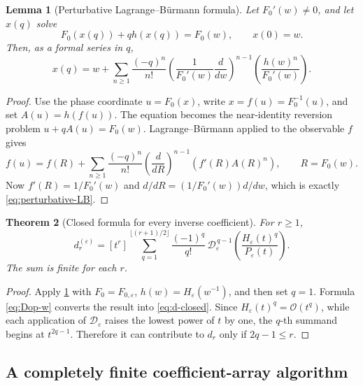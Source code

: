 \documentclass[11pt,a4paper]{article}
\theoremstyle{clean}
\newtheorem{theorem}{Theorem}[section]
\newtheorem{lemma}[theorem]{Lemma}
\theoremstyle{definition}
\newcommand{\eps}{\varepsilon}
\newcommand{\Coeff}[2]{\left[#1\right]#2}
\newcommand{\OO}{\mathcal O}
\newcommand{\Dop}{\mathscr D}
\begin{document}
\begin{lemma}[Perturbative Lagrange--B\"urmann formula]
\label{lem:perturbative-LB}
Let \(F_0'(w)\ne0\), and let \(x(q)\) solve
\[
 F_0(x(q))+q h(x(q))=F_0(w),\qquad x(0)=w.
\]
Then, as a formal series in \(q\),
\begin{equation}
 x(q)=w+\sum_{n\ge1}\frac{(-q)^n}{n!}
 \left(\frac1{F_0'(w)}\frac{d}{dw}\right)^{n-1}
 \left(\frac{h(w)^n}{F_0'(w)}\right).
 \label{eq:perturbative-LB}
\end{equation}
\end{lemma}

\begin{proof}
Use the phase coordinate \(u=F_0(x)\), write \(x=f(u)=F_0^{-1}(u)\), and set \(A(u)=h(f(u))\).  The equation becomes the near-identity reversion problem
\(u+qA(u)=F_0(w)\).  Lagrange--B\"urmann applied to the observable \(f\) gives
\[
 f(u)=f(R)+\sum_{n\ge1}\frac{(-q)^n}{n!}
 \left(\frac{d}{dR}\right)^{n-1}\!\left(f'(R)A(R)^n\right),
 \qquad R=F_0(w).
\]
Now \(f'(R)=1/F_0'(w)\) and \(d/dR=(1/F_0'(w))d/dw\), which is exactly \cref{eq:perturbative-LB}.
\end{proof}

\begin{theorem}[Closed formula for every inverse coefficient]
\label{thm:d-closed}
For \(r\ge1\),
\begin{equation}
 \boxed{\displaystyle
 d_r^{(\eps)}=
 \Coeff{t^r}{
 \sum_{q=1}^{\lfloor(r+1)/2\rfloor}
 \frac{(-1)^q}{q!}\,
 \Dop_\eps^{\,q-1}
 \left(\frac{H_\eps(t)^q}{P_\eps(t)}\right)}.}
 \label{eq:d-closed}
\end{equation}
The sum is finite for each \(r\).
\end{theorem}

\begin{proof}
Apply \cref{lem:perturbative-LB} with
\(
 F_0=F_{0,\eps}
\),
\(
 h(w)=H_\eps(w^{-1})
\), and then set \(q=1\).  Formula \cref{eq:Dop-w} converts the result into \cref{eq:d-closed}.  Since \(H_\eps(t)^q=\OO(t^q)\), while each application of \(\Dop_\eps\) raises the lowest power of \(t\) by one, the \(q\)-th summand begins at \(t^{2q-1}\).  Therefore it can contribute to \(d_r\) only if \(2q-1\le r\).
\end{proof}

\subsection{A completely finite coefficient-array algorithm}
\end{document}
